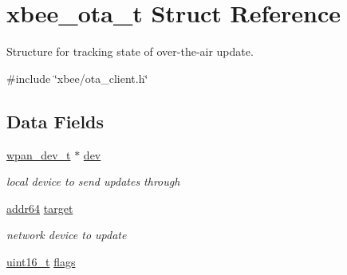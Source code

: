 \hypertarget{structxbee__ota__t}{\section{xbee\-\_\-ota\-\_\-t Struct Reference}
\label{structxbee__ota__t}
}


Structure for tracking state of over-\/the-\/air update.  




{\ttfamily \#include \char`\"{}xbee/ota\-\_\-client.\-h\char`\"{}}

\subsection*{Data Fields}
\begin{DoxyCompactItemize}
\item 
\hypertarget{group__xbee__ota__client_gaa7262b389539547f7405189cd4bf274c}{\hyperlink{structwpan__dev__t}{wpan\-\_\-dev\-\_\-t} $\ast$ \hyperlink{group__xbee__ota__client_gaa7262b389539547f7405189cd4bf274c}{dev}}\label{group__xbee__ota__client_gaa7262b389539547f7405189cd4bf274c}

\begin{DoxyCompactList}\small\item\em local device to send updates through \end{DoxyCompactList}\item 
\hypertarget{group__xbee__ota__client_gaef649f9dfe9109ac17db3fda73c61036}{\hyperlink{unionaddr64}{addr64} \hyperlink{group__xbee__ota__client_gaef649f9dfe9109ac17db3fda73c61036}{target}}\label{group__xbee__ota__client_gaef649f9dfe9109ac17db3fda73c61036}

\begin{DoxyCompactList}\small\item\em network device to update \end{DoxyCompactList}\item 
\hypertarget{group__xbee__ota__client_ga1e87af3c18a2fd36c61faf89949bdc3f}{\hyperlink{group__hal_ga5a8b2dc9e45a9ee81a94ef304fb62505}{uint16\-\_\-t} \hyperlink{group__xbee__ota__client_ga1e87af3c18a2fd36c61faf89949bdc3f}{flags}}\label{group__xbee__ota__client_ga1e87af3c18a2fd36c61faf89949bdc3f}


\end{DoxyCompactItemize}
